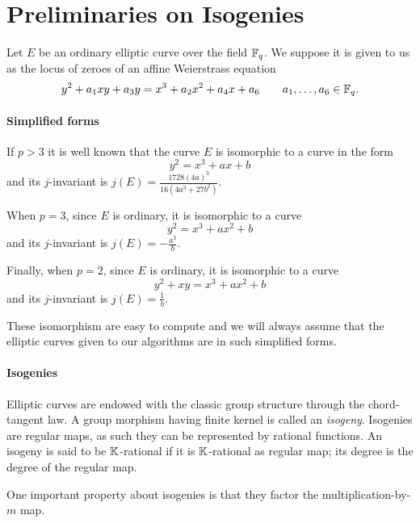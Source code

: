 \section{Preliminaries on Isogenies}
\label{sec:preliminaries}

Let $E$ be an ordinary elliptic curve over the field $\mathbb{F}_q$. We
suppose it is given to us as the locus of zeroes of an affine
Weierstrass equation
\[y^2 + a_1xy + a_3y = x^3 + a_2x^2 + a_4x + a_6
\qquad a_1,\ldots,a_6\in\mathbb{F}_q\text{.}\]

\paragraph{Simplified forms} If $p>3$ it is well known that the curve
$E$ is isomorphic to a curve in the form
\begin{equation}
  \label{eq:weierstrass>3}
  y^2 = x^3 + ax + b
\end{equation}
and its $j$-invariant is $j(E) = \frac{1728(4a)^3}{16(4a^3 + 27b^2)}$.

When $p=3$, since $E$ is ordinary, it is isomorphic to a curve
\begin{equation}
  \label{eq:weierstrass=3}
  y^2 = x^3 + ax^2 + b
\end{equation}
and its $j$-invariant is $j(E) = -\frac{a^3}{b}$.

Finally, when $p=2$, since $E$ is ordinary, it is isomorphic to a curve
\begin{equation}
  \label{eq:weierstrass=2}
  y^2 + xy = x^3 + ax^2 + b
\end{equation}
and its $j$-invariant is $j(E) = \frac{1}{b}$.

These isomorphism are easy to compute and we will always assume that
the elliptic curves given to our algorithms are in such simplified
forms.

\paragraph{Isogenies}
Elliptic curves are endowed with the classic group structure through
the chord-tangent law. A group morphism having finite kernel is called
an \emph{isogeny}. Isogenies are regular maps, as such they can be
represented by rational functions. An isogeny is said to be
$\mathbb{K}$-rational if it is $\mathbb{K}$-rational as regular map; its degree is the
degree of the regular map.

One important property about isogenies is that they factor the
multiplication-by-$m$ map.

